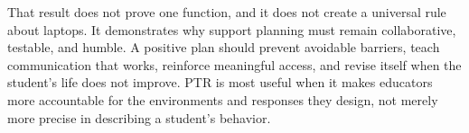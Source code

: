 \documentclass[11pt]{article}
\begin{document}
That result does not prove one function, and it does not create a universal rule about laptops. It demonstrates why support planning must remain collaborative, testable, and humble. A positive plan should prevent avoidable barriers, teach communication that works, reinforce meaningful access, and revise itself when the student's life does not improve. PTR is most useful when it makes educators more accountable for the environments and responses they design, not merely more precise in describing a student's behavior.

\small

\end{document}
